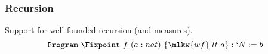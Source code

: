 \begin{frame}
  \frametitle{Recursion}

  Support for well-founded recursion (and measures).
  \[ \texttt{Program}~\Fixpoint~f~(a : nat)~\{ \mlkw{wf}~lt~a \} : \nat := b \]
  
\end{frame}


